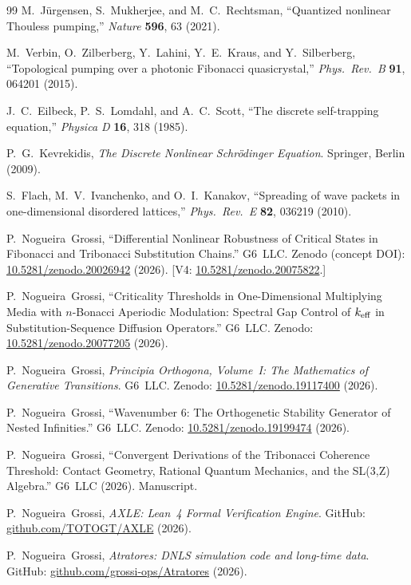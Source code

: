 \documentclass[12pt,a4paper]{article}
\begin{document}
\begin{thebibliography}{99}
M.~J\"{u}rgensen, S.~Mukherjee, and M.~C.~Rechtsman,
``Quantized nonlinear Thouless pumping,''
\textit{Nature} \textbf{596}, 63 (2021).

M.~Verbin, O.~Zilberberg, Y.~Lahini, Y.~E.~Kraus, and Y.~Silberberg,
``Topological pumping over a photonic Fibonacci quasicrystal,''
\textit{Phys.\ Rev.\ B} \textbf{91}, 064201 (2015).

J.~C.~Eilbeck, P.~S.~Lomdahl, and A.~C.~Scott,
``The discrete self-trapping equation,''
\textit{Physica D} \textbf{16}, 318 (1985).

P.~G.~Kevrekidis,
\textit{The Discrete Nonlinear Schr\"{o}dinger Equation}.
Springer, Berlin (2009).

S.~Flach, M.~V.~Ivanchenko, and O.~I.~Kanakov,
``Spreading of wave packets in one-dimensional disordered lattices,''
\textit{Phys.\ Rev.\ E} \textbf{82}, 036219 (2010).

P.~Nogueira~Grossi,
``Differential Nonlinear Robustness of Critical States in Fibonacci and
Tribonacci Substitution Chains.''
G6~LLC. Zenodo (concept DOI):
\href{https://doi.org/10.5281/zenodo.20026942}{10.5281/zenodo.20026942}
(2026). [V4: \href{https://doi.org/10.5281/zenodo.20075822}{10.5281/zenodo.20075822}.]

P.~Nogueira~Grossi,
``Criticality Thresholds in One-Dimensional Multiplying Media
with $n$-Bonacci Aperiodic Modulation:
Spectral Gap Control of $k_{\rm eff}$ in
Substitution-Sequence Diffusion Operators.''
G6~LLC. Zenodo:
\href{https://doi.org/10.5281/zenodo.20077205}{10.5281/zenodo.20077205}
(2026).

P.~Nogueira~Grossi,
\textit{Principia Orthogona, Volume~I: The Mathematics of Generative Transitions}.
G6~LLC. Zenodo: \href{https://doi.org/10.5281/zenodo.19117400}{10.5281/zenodo.19117400} (2026).

P.~Nogueira~Grossi,
``Wavenumber 6: The Orthogenetic Stability Generator of Nested Infinities.''
G6~LLC. Zenodo: \href{https://doi.org/10.5281/zenodo.19199474}{10.5281/zenodo.19199474} (2026).

P.~Nogueira~Grossi,
``Convergent Derivations of the Tribonacci Coherence Threshold:
Contact Geometry, Rational Quantum Mechanics, and the SL(3,Z) Algebra.''
G6~LLC (2026). Manuscript.

P.~Nogueira~Grossi,
\textit{AXLE: Lean~4 Formal Verification Engine}.
GitHub: \href{https://github.com/TOTOGT/AXLE}{github.com/TOTOGT/AXLE} (2026).

P.~Nogueira~Grossi,
\textit{Atratores: DNLS simulation code and long-time data}.
GitHub: \href{https://github.com/grossi-ops/Atratores}{github.com/grossi-ops/Atratores} (2026).

\end{thebibliography}
\end{document}
